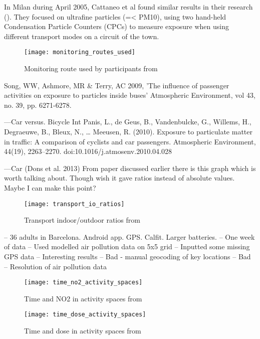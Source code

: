 
In Milan during April 2005, Cattaneo et al found similar results in their research (\cite{Cattaneo2009}). They focused on ultrafine particles (=< PM10), using two hand-held Condensation Particle Counters (CPCs) to measure exposure when using different transport modes on a circuit of the town.

\begin{figure}[H]
\centering
\texttt{[image: monitoring\_routes\_used]}
\caption{Monitoring route used by participants from \cite{Cattaneo2009}}
\label{fig:monitoring_routes_used}
\end{figure}

Song, WW, Ashmore, MR \& Terry, AC 2009, 'The influence of passenger activities on exposure to particles inside buses' Atmospheric Environment, vol 43, no. 39, pp. 6271-6278.

---Car versus. Bicycle
Int Panis, L., de Geus, B., Vandenbulcke, G., Willems, H., Degraeuwe, B., Bleux, N., … Meeusen, R. (2010). Exposure to particulate matter in traffic: A comparison of cyclists and car passengers. Atmospheric Environment, 44(19), 2263–2270. doi:10.1016/j.atmosenv.2010.04.028

---Car
(Dons et al. 2013)
From paper discussed earlier there is this graph which is worth talking about. Though wish it gave ratios instead of absolute values. Maybe I can make this point?

\begin{figure}[H]
\centering
\texttt{[image: transport\_io\_ratios]}
\caption{Transport indoor/outdoor ratios from \cite{Dons2013}}
\label{fig:transport_io_ratios}
\end{figure}

\cite{DeNazelle2013}
-- 36 adults in Barcelona. Android app. GPS. Calfit. Larger batteries.
-- One week of data
-- Used modelled air pollution data on 5x5 grid
-- Inputted some missing GPS data
-- Interesting results
-- Bad - manual geocoding of key locations
-- Bad – Resolution of air pollution data

\begin{figure}[H]
\centering
\texttt{[image: time\_no2\_activity\_spaces]}
\caption{Time and NO2 in activity spaces from \cite{DeNazelle2013}}
\label{fig:time_no2_activity_spaces}
\end{figure}

\begin{figure}[H]
\centering
\texttt{[image: time\_dose\_activity\_spaces]}
\caption{Time and dose in activity spaces from \cite{DeNazelle2013}}
\label{fig:time_dose_activity_spaces}
\end{figure}

